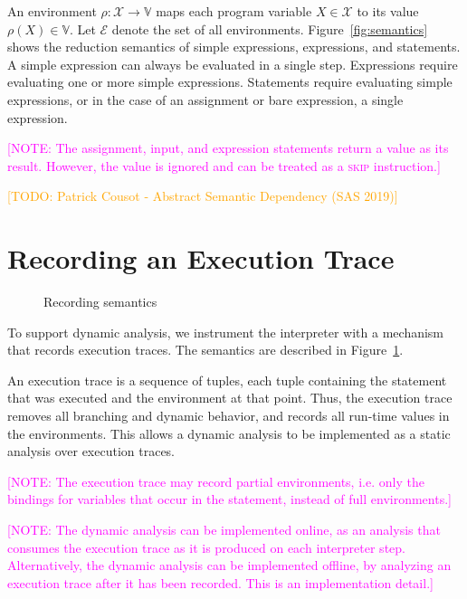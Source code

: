 \documentclass{article}
\newcommand{\vars}{\ensuremath{\mathcal{X}}\xspace} %
\newcommand{\vals}{\ensuremath{\mathbb{V}}\xspace} %
\newcommand{\envs}{\ensuremath{\mathcal{E}}\xspace} %
\newcommand{\irem}[3]{{\noindent\textcolor{#1}{\textsf{[#2: 
#3]}}}}
\newcommand{\todo}[1]{\irem{orange}{TODO}{#1}}
\newcommand{\note}[1]{\irem{magenta}{NOTE}{#1}}
\begin{document}
An environment $\rho\colon \vars \rightarrow \vals$ maps each program variable $X \in \vars$ to its value $\rho(X) \in \vals$. Let \envs denote the set of all environments. 
Figure~\ref{fig:semantics} shows the reduction semantics of simple expressions, expressions, and statements.
A simple expression can always be evaluated in a single step. Expressions
require evaluating one or more simple expressions. Statements require evaluating
simple expressions, or in the case of an assignment or bare expression, a single
expression.

\note{The assignment, input, and expression statements return a value as its result.
However, the value is ignored and can be treated as a \textsc{skip} instruction.}

\todo{Patrick Cousot - Abstract Semantic Dependency (SAS 2019)}

\section*{Recording an Execution Trace}

\begin{figure}[th!]
  \begin{center}
    \begin{small}
      \ottdefnrec{}
    \end{small}
  \end{center}
  \vspace{-1em}
  \caption{Recording semantics}\label{fig:rec-semantics}
  \vspace{-1em}
\end{figure}

To support dynamic analysis, we instrument the interpreter with a mechanism that
records execution traces. The semantics are described in
Figure~\ref{fig:rec-semantics}.

An execution trace is a sequence of tuples, each tuple
containing the statement that was executed and the environment at that point.
Thus, the execution trace removes all branching and dynamic behavior, and
records all run-time values in the environments. This allows a dynamic analysis
to be implemented as a static analysis over execution traces.

\note{The execution trace may record partial environments, i.e. only the
bindings for variables that occur in the statement, instead of full
environments.}

\note{The dynamic analysis can be implemented online, as an analysis that
consumes the execution trace as it is produced on each interpreter step.
Alternatively, the dynamic analysis can be implemented offline, by analyzing an
execution trace after it has been recorded. This is an implementation detail.}
\end{document}
